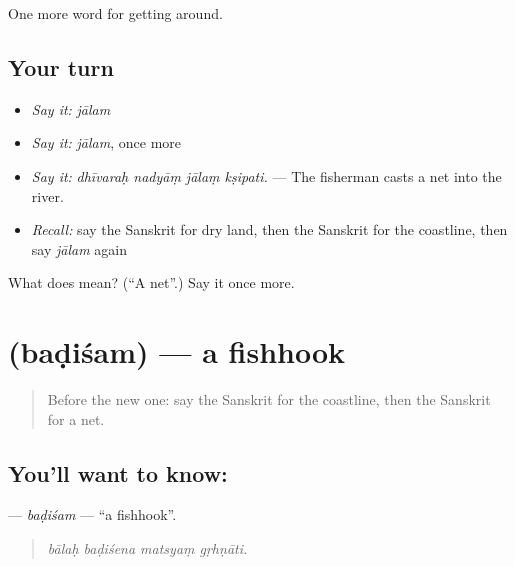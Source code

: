 \begin{grammarlens}[title={What you've built}]
One more word for getting around.
\end{grammarlens}

\subsection*{Your turn}
\begin{itemize}
\raggedright
  \item \emph{Say it:} \emph{jālam}
  \item \emph{Say it:} \emph{jālam}, once more
  \item \emph{Say it:} \emph{dhīvaraḥ nadyāṃ jālaṃ kṣipati.} — The fisherman casts a net into the river.
  \item \emph{Recall:} say the Sanskrit for dry land, then the Sanskrit for the coastline, then say \emph{jālam} again
\end{itemize}

\begin{tcolorbox}[breakable,colback=teal!4,colframe=teal!35!black,title={Before you move on}]
What does  mean? (\textquotedblleft{}A net\textquotedblright{}.) Say it once more.
\end{tcolorbox}
\section[\texorpdfstring{\sk{बडिशम्} (baḍiśam)}{बडिशम् (baḍiśam)}]{ (baḍiśam) — a fishhook}

\label{lesson:SA-C418-badisam}



\begin{quote}
Before the new one: say the Sanskrit for the coastline, then the Sanskrit for a net.
\end{quote}

\subsection*{You'll want to know: }
\textbf{} — \emph{baḍiśam} — \textquotedblleft{}a fishhook\textquotedblright{}.

\begin{quote}
   
\end{quote}

\begin{quote}
\emph{bālaḥ baḍiśena matsyaṃ gṛhṇāti.}
\end{quote}

